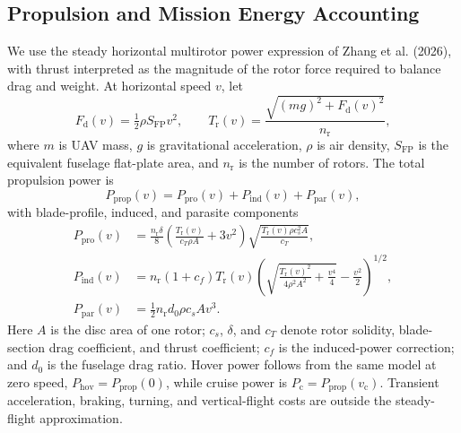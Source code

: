 \documentclass[conference]{IEEEtran}
\newcommand{\hov}{\mathrm{hov}}
\begin{document}
\subsection{Propulsion and Mission Energy Accounting}
We use the steady horizontal multirotor power expression of Zhang et al. (2026), with thrust interpreted as the magnitude of the rotor force required to balance drag and weight. At horizontal speed $v$, let
\begin{equation}
F_{\mathrm d}(v)=\tfrac12\rho S_{\mathrm{FP}}v^2,\qquad
T_{\mathrm r}(v)=\frac{\sqrt{(mg)^2+F_{\mathrm d}(v)^2}}{n_{\mathrm r}},
\label{eq:thrust}
\end{equation}
where $m$ is UAV mass, $g$ is gravitational acceleration, $\rho$ is air density, $S_{\mathrm{FP}}$ is the equivalent fuselage flat-plate area, and $n_{\mathrm r}$ is the number of rotors. The total propulsion power is
\begin{equation}
P_{\mathrm{prop}}(v)=P_{\mathrm{pro}}(v)
+P_{\mathrm{ind}}(v)+P_{\mathrm{par}}(v),
\label{eq:propulsion}
\end{equation}
with blade-profile, induced, and parasite components
\begin{align}
P_{\mathrm{pro}}(v)&=\frac{n_{\mathrm r}\delta}{8}
\left(\frac{T_{\mathrm r}(v)}{c_T\rho A}+3v^2\right)
\sqrt{\frac{T_{\mathrm r}(v)\rho c_s^2 A}{c_T}},
\label{eq:profile}\\
P_{\mathrm{ind}}(v)&=n_{\mathrm r}(1+c_f)T_{\mathrm r}(v)
\left(\sqrt{\frac{T_{\mathrm r}(v)^2}{4\rho^2A^2}
+\frac{v^4}{4}}-\frac{v^2}{2}\right)^{1/2},
\label{eq:induced}\\
P_{\mathrm{par}}(v)&=\tfrac12n_{\mathrm r}d_0\rho c_sAv^3.
\label{eq:parasite}
\end{align}
Here $A$ is the disc area of one rotor; $c_s$, $\delta$, and $c_T$ denote rotor solidity, blade-section drag coefficient, and thrust coefficient; $c_f$ is the induced-power correction; and $d_0$ is the fuselage drag ratio. Hover power follows from the same model at zero speed, $P_{\hov}=P_{\mathrm{prop}}(0)$, while cruise power is $P_{\mathrm c}=P_{\mathrm{prop}}(v_{\mathrm c})$. Transient acceleration, braking, turning, and vertical-flight costs are outside the steady-flight approximation.
\end{document}
